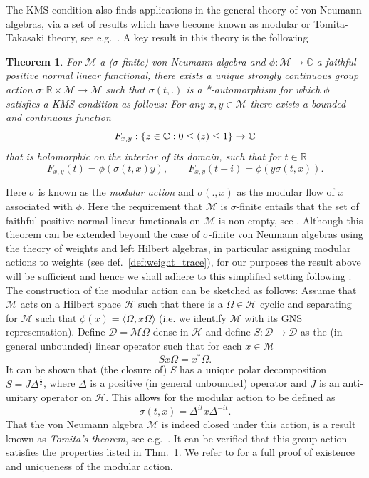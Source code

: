 \documentclass[sn-mathphys-num]{sn-jnl}%
\let\Im\relax
\DeclareMathOperator{\Im}{Im}
\newcommand{\CC}{\mathbb{C}}
\newcommand{\RR}{\mathbb{R}}
\newcommand{\HH}{\mathcal{H}}
\newcommand{\MM}{\mathcal{M}}
\numberwithin{equation}{section}
\theoremstyle{thmstyleone}%
\newtheorem{theorem}{Theorem}[section]%
\theoremstyle{thmstyletwo}%
\theoremstyle{thmstylethree}%
\begin{document}
The KMS condition also finds applications in the general theory of von Neumann algebras, via a set of results which have become known as modular or Tomita-Takasaki theory, see e.g.\ \cite{takesaki1970tomita,vanDaele:1978,takesaki2002}. A key result in this theory is the following
\begin{theorem}
    \label{thm:modular_action}
    For $\MM$ a ($\sigma$-finite) von Neumann algebra and $\phi:\MM\to\CC$ a faithful positive normal linear functional, there exists a unique strongly continuous group action $\sigma:\mathbb{R}\times\MM\to \MM$ such that $\sigma(t,.)$ is a *-automorphism for which $\phi$ satisfies a KMS condition as follows: For any $x,y\in \MM$ there exists a bounded and continuous function 
    \begin{equation}
        F_{x,y}:\{z\in \CC:0\leq \Im(z)\leq 1\}\to \CC
    \end{equation}
    that is holomorphic on the interior of its domain, such that for $t\in \RR$
    \begin{equation}
        F_{x,y}(t)=\phi(\sigma(t,x)y),\qquad F_{x,y}(t+i)=\phi(y\sigma(t,x)).
    \end{equation}
\end{theorem}
Here $\sigma$ is known as the \textit{modular action} and $\sigma(.,x)$ as the modular flow of $x$ associated with $\phi$. Here the requirement that $\MM$ is $\sigma$-finite entails that the set of faithful positive normal linear functionals on $\MM$ is non-empty, see \cite[Prop.\ II.3.19]{Takesaki2001}. Although this theorem can be extended beyond the case of $\sigma$-finite von Neumann algebras using the theory of weights and left Hilbert algebras, in particular assigning modular actions to weights (see def.\ \ref{def:weight_trace}), for our purposes the result above will be sufficient and hence we shall adhere to this simplified setting following \cite{vanDaele:1978}. The construction of the modular action can be sketched as follows: Assume that $\MM$ acts on a Hilbert space $\HH$ such that there is a $\Omega\in\HH$ cyclic and separating for $\MM$ such that $\phi(x)=\langle \Omega,x\Omega\rangle $ (i.e. we identify $\MM$ with its GNS representation).
Define $\mathcal{D}=\MM\Omega$ dense in $\HH$ and define $S:\mathcal{D}\to\mathcal{D}$ as the (in general unbounded) linear operator such that for each $x\in \MM$
\begin{equation}
    S x\Omega=x^*\Omega.
\end{equation}
It can be shown that (the closure of) $S$ has a unique polar decomposition $S=J\Delta^{\frac{1}{2}}$, where $\Delta$ is a positive (in general unbounded) operator and $J$ is an anti-unitary operator on $\HH$. This allows for the modular action to be defined as 
\begin{equation}
    \sigma(t,x)=\Delta^{it}x\Delta^{-it}.
\end{equation} That the von Neumann algebra $\mathcal{M}$ is indeed closed under this action, is a result known as \textit{Tomita's theorem}, see e.g.\ \cite{takesaki1970tomita}. It can be verified that this group action satisfies the properties listed in Thm.\ \ref{thm:modular_action}. We refer to \cite[Thm.\ VI.1.19 and VIII.1.2]{takesaki2002} for a full proof of existence and uniqueness of the modular action.
\end{document}
